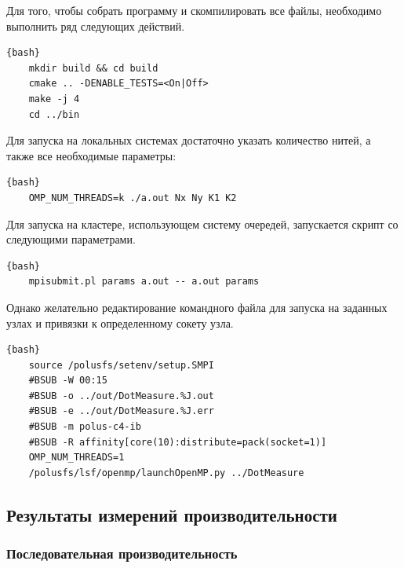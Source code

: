 \documentclass[12pt, a4paper]{article}
\begin{document}
Для того, чтобы собрать программу и скомпилировать все файлы, необходимо выполнить ряд следующих действий.

\begin{lstlisting}{bash}
	mkdir build && cd build
	cmake .. -DENABLE_TESTS=<On|Off>
	make -j 4
	cd ../bin
\end{lstlisting}

Для запуска на локальных системах достаточно указать количество нитей, а также все необходимые параметры:

\begin{lstlisting}{bash}
	OMP_NUM_THREADS=k ./a.out Nx Ny K1 K2
\end{lstlisting}

Для запуска на кластере, использующем систему очередей, запускается скрипт со следующими параметрами.

\begin{lstlisting}{bash}
	mpisubmit.pl params a.out -- a.out params
\end{lstlisting}

Однако желательно редактирование командного файла для запуска на заданных узлах и привязки к определенному сокету узла.

\begin{lstlisting}{bash}
	source /polusfs/setenv/setup.SMPI
	#BSUB -W 00:15
	#BSUB -o ../out/DotMeasure.%J.out
	#BSUB -e ../out/DotMeasure.%J.err
	#BSUB -m polus-c4-ib
	#BSUB -R affinity[core(10):distribute=pack(socket=1)]
	OMP_NUM_THREADS=1
	/polusfs/lsf/openmp/launchOpenMP.py ../DotMeasure
\end{lstlisting}


\subsection{Результаты измерений производительности}

\subsubsection{Последовательная производительность}
\end{document}
